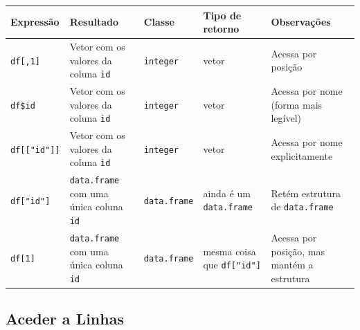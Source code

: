 \documentclass[
]{book}
\begin{document}
\begin{longtable}[]{@{}
  >{\raggedright\arraybackslash}p{}
  >{\raggedright\arraybackslash}p{}
  >{\raggedright\arraybackslash}p{}
  >{\raggedright\arraybackslash}p{}
  >{\raggedright\arraybackslash}p{}@{}}
\toprule\noalign{}
\begin{minipage}[b]{\linewidth}\raggedright
Expressão
\end{minipage} & \begin{minipage}[b]{\linewidth}\raggedright
Resultado
\end{minipage} & \begin{minipage}[b]{\linewidth}\raggedright
Classe
\end{minipage} & \begin{minipage}[b]{\linewidth}\raggedright
Tipo de retorno
\end{minipage} & \begin{minipage}[b]{\linewidth}\raggedright
Observações
\end{minipage} \\
\midrule\noalign{}
\endhead
\bottomrule\noalign{}
\endlastfoot
\texttt{df{[},1{]}} & Vetor com os valores da coluna \texttt{id} & \texttt{integer} & vetor & Acessa por posição \\
\texttt{df\$id} & Vetor com os valores da coluna \texttt{id} & \texttt{integer} & vetor & Acessa por nome (forma mais legível) \\
\texttt{df{[}{[}"id"{]}{]}} & Vetor com os valores da coluna \texttt{id} & \texttt{integer} & vetor & Acessa por nome explicitamente \\
\texttt{df{[}"id"{]}} & \texttt{data.frame} com uma única coluna \texttt{id} & \texttt{data.frame} & ainda é um \texttt{data.frame} & Retém estrutura de \texttt{data.frame} \\
\texttt{df{[}1{]}} & \texttt{data.frame} com uma única coluna \texttt{id} & \texttt{data.frame} & mesma coisa que \texttt{df{[}"id"{]}} & Acessa por posição, mas mantém a estrutura \\
\end{longtable}

\subsection{Aceder a Linhas}\label{aceder-a-linhas}
\end{document}
